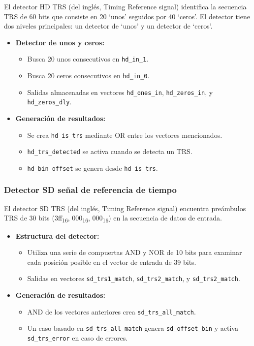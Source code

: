 El detector HD TRS (del inglés, Timing Reference signal) identifica la secuencia
TRS de 60 bits que consiste en 20 `unos' seguidos por 40 `ceros'. El detector tiene
dos niveles principales: un detector de `unos' y un detector de `ceros'.

\begin{itemize}
    \item \textbf{Detector de unos y ceros:}
    \begin{itemize}
        \item Busca 20 unos consecutivos en \texttt{hd\_in\_1}.
        \item Busca 20 ceros consecutivos en \texttt{hd\_in\_0}.
        \item Salidas almacenadas en vectores \texttt{hd\_ones\_in}, \texttt{hd\_zeros\_in}, y \texttt{hd\_zeros\_dly}.
    \end{itemize}
    
    \item \textbf{Generación de resultados:}
    \begin{itemize}
        \item Se crea \texttt{hd\_is\_trs} mediante OR entre los vectores mencionados.
        \item \texttt{hd\_trs\_detected} se activa cuando se detecta un TRS.
        \item \texttt{hd\_bin\_offset} se genera desde \texttt{hd\_is\_trs}.
    \end{itemize}
\end{itemize}

\subsubsection{Detector SD señal de referencia de tiempo}

El detector SD TRS (del inglés, Timing Reference signal) encuentra preámbulos TRS de 30 bits (3ff\textsubscript{16},
000\textsubscript{16}, 000\textsubscript{16}) en
la secuencia de datos de entrada.

\begin{itemize}
    \item \textbf{Estructura del detector:}
    \begin{itemize}
        \item Utiliza una serie de compuertas AND y NOR de 10 bits para examinar cada posición posible en el vector de entrada de 39 bits.
        \item Salidas en vectores \texttt{sd\_trs1\_match}, \texttt{sd\_trs2\_match}, y \texttt{sd\_trs2\_match}.
    \end{itemize}
    
    \item \textbf{Generación de resultados:}
    \begin{itemize}
        \item AND de los vectores anteriores crea \texttt{sd\_trs\_all\_match}.
        \item Un caso basado en \texttt{sd\_trs\_all\_match} genera \texttt{sd\_offset\_bin} y activa \texttt{sd\_trs\_error} en caso de errores.
    \end{itemize}
\end{itemize}

